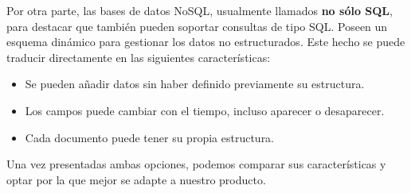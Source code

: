 Por otra parte, las bases de datos NoSQL, usualmente llamados \textbf{no sólo SQL}, para destacar que también pueden soportar consultas de tipo SQL. Poseen un esquema dinámico para gestionar los datos no estructurados. Este hecho se puede traducir directamente en las siguientes características:

\begin{itemize}
	\item Se pueden añadir datos sin haber definido previamente su estructura.
	\item Los campos puede cambiar con el tiempo, incluso aparecer o desaparecer.
	\item Cada documento puede tener su propia estructura.
\end{itemize}

Una vez presentadas ambas opciones, podemos comparar sus características y optar por la que mejor se adapte a nuestro producto.

